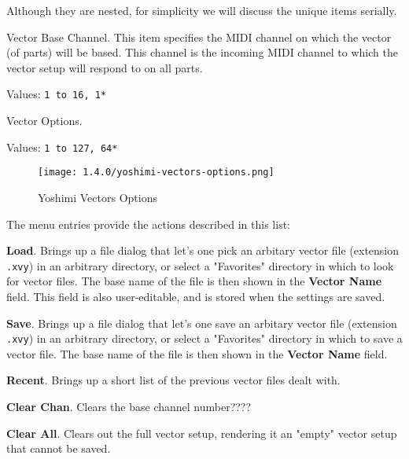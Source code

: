    Although they are nested, for simplicity we will discuss the unique items
   serially.

   \setcounter{ItemCounter}{0}      %

   Vector Base Channel.
   This item specifies the MIDI channel on which the vector (of parts) will be
   based.  This channel is the incoming MIDI channel to which the vector setup
   will respond to on all parts.

   Values: \texttt{1 to 16, 1*}

   Vector Options.

   Values: \texttt{1 to 127, 64*}

\begin{figure}[H]
   \centering
   \texttt{[image: 1.4.0/yoshimi-vectors-options.png]}
   \caption{Yoshimi Vectors Options}
   \label{fig:yoshimi_vectors_options}
\end{figure}

   The menu entries provide the actions described in this list:

   \begin{enumber}
      \item \textbf{Load}.
         Brings up a file dialog that let's one pick an arbitary vector file
         (extension \texttt{.xvy}) in an arbitrary directory, or select a
         "Favorites" directory in which to look for vector files.
         The base name of the file is then shown in the \textbf{Vector Name}
         field.  This field is also user-editable, and is stored when the
         settings are saved.
      \item \textbf{Save}.
         Brings up a file dialog that let's one save an arbitary vector file
         (extension \texttt{.xvy}) in an arbitrary directory, or select a
         "Favorites" directory in which to save a vector file.
         The base name of the file is then shown in the \textbf{Vector Name}
         field.
      \item \textbf{Recent}.
         Brings up a short list of the previous vector files dealt with.
      \item \textbf{Clear Chan}.
         Clears the base channel number????
      \item \textbf{Clear All}.
         Clears out the full vector setup, rendering it an "empty" vector setup
         that cannot be saved.
   \end{enumber}

